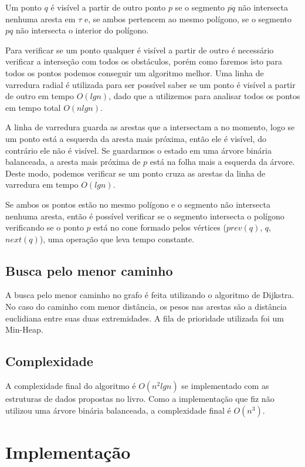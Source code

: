 \documentclass[11pt]{article} %
\begin{document}
Um ponto $q$ é visível a partir de outro ponto $p$ se o segmento $\overline{pq}$ não intersecta nenhuma aresta em $\tau$ e, se ambos pertencem ao mesmo polígono, se o segmento $pq$ não intersecta o interior do polígono. 

Para verificar se um ponto qualquer é visível a partir de outro é necessário verificar a interseção com todos os obstáculos, porém como faremos isto para todos os pontos podemos conseguir um algoritmo melhor. Uma linha de varredura radial é utilizada para ser possível saber se um ponto é visível a partir de outro em tempo $O(lg n)$, dado que a utilizemos para analisar todos os pontos em tempo total $O(n lg n)$.

A linha de varredura  guarda as arestas que a intersectam a no momento, logo se um ponto está a esquerda da aresta mais próxima, então ele é visível, do contrário ele não é visível. Se guardarmos o estado em uma árvore binária balanceada, a aresta mais próxima de $p$ está na folha mais a esquerda da árvore. Deste modo, podemos verificar se um ponto cruza as arestas da linha de varredura em tempo $O(lg n)$.

Se ambos os pontos estão no mesmo polígono e o segmento não intersecta nenhuma aresta, então é possível verificar se o segmento intersecta o polígono verificando se o ponto $p$ está no cone formado pelos vértices ($prev(q)$, $q$, $next(q)$), uma operação que leva tempo constante.

\subsection{Busca pelo menor caminho}

A busca pelo menor caminho no grafo é feita utilizando o algoritmo de Dijkstra. No caso do caminho com menor distância, os pesos nas arestas são a distância euclidiana entre suas duas extremidades. A fila de prioridade utilizada foi um Min-Heap.

\subsection{Complexidade}

A complexidade final do algoritmo é $O(n^2 lg n)$ se implementado com as estruturas de dados propostas no livro. Como a implementação que fiz não utilizou uma árvore binária balanceada, a complexidade final é $O(n^3)$.

\section{Implementação}
\end{document}
